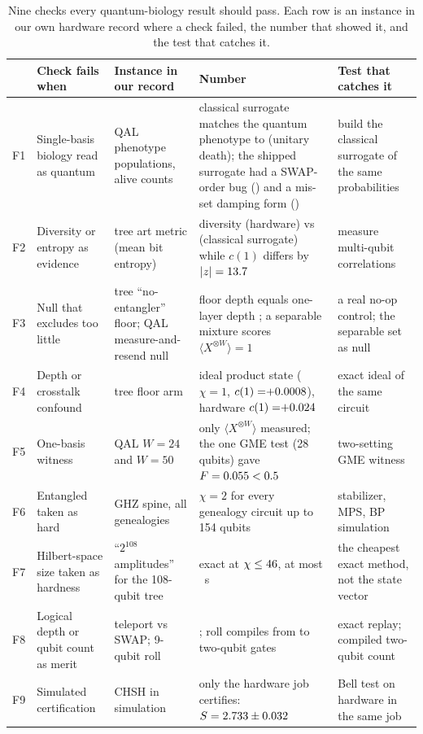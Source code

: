 \begin{table}[t]
\centering
\caption{Nine checks every quantum-biology result should pass. Each row is an instance in our own hardware
record where a check failed, the number that showed it, and the test that catches it.}
\label{tab:audit}
\small
\begin{tabular}{p{0.3cm}p{2.9cm}p{4.3cm}p{5.0cm}p{3.6cm}}
\toprule
& Check fails when & Instance in our record & Number & Test that catches it\\
\midrule
F1 & Single-basis biology read as quantum & QAL phenotype populations, alive counts & classical surrogate matches the
quantum phenotype to \surrUnitaryFixed{} (unitary death); the shipped surrogate had a SWAP-order bug
(\surrUnitaryCode{}) and a mis-set damping form (\surrDamp{}) & build the classical surrogate of the same
probabilities\\
F2 & Diversity or entropy as evidence & tree art metric (mean bit entropy) & diversity \qtDivHw{} (hardware) vs
\qtDivSim{} (classical surrogate) while $c(1)$ differs by $|z|=13.7$ & measure multi-qubit correlations\\
F3 & Null that excludes too little & tree ``no-entangler'' floor; QAL measure-and-resend null & floor depth
\qtDepthFloor{} equals one-layer depth \qtDepthLone{}; a separable mixture scores $\langle X^{\otimes W}\rangle=1$ &
a real no-op control; the separable set as null\\
F4 & Depth or crosstalk confound & tree floor arm & ideal product state ($\chi=1$, $c(1)=\qtIdealLoneMean$), hardware
$c(1)=\qtHwLoneMean$ & exact ideal of the same circuit\\
F5 & One-basis witness & QAL $W=24$ and $W=50$ & only $\langle X^{\otimes W}\rangle$ measured; the one GME test
(28 qubits) gave $F=0.055<0.5$ & two-setting GME witness~\cite{toth2005}\\
F6 & Entangled taken as hard & GHZ spine, all genealogies & $\chi=2$ for every genealogy circuit up to 154 qubits
& stabilizer, MPS, BP simulation\\
F7 & Hilbert-space size taken as hardness & ``$2^{108}$ amplitudes'' for the 108-qubit tree & exact at
$\chi\le46$, at most \qtCostLfour{}~s & the cheapest exact method, not the state vector\\
F8 & Logical depth or qubit count as merit & teleport vs SWAP; 9-qubit roll & \teleportAuditCell{}; roll compiles
from \rollTwoQLogical{} to \rollTwoQIsa{} two-qubit gates & exact replay; compiled two-qubit count\\
F9 & Simulated certification & CHSH in simulation & only the hardware job certifies: $S=2.733\pm0.032$
& Bell test on hardware in the same job\\
\bottomrule
\end{tabular}
\end{table}

